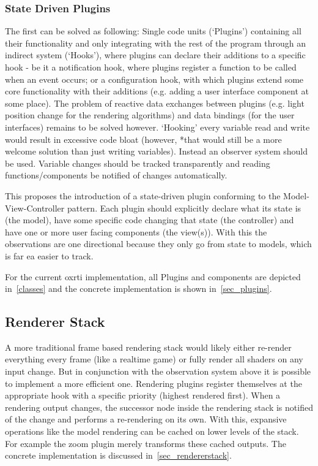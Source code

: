 \subsubsection{State Driven Plugins}
The first can be solved as following: Single code units (`Plugins')
containing all their functionality and only integrating with the rest of the
program through an indirect system (`Hooks'), where plugins can declare their
additions to a specific hook - be it a notification hook, where plugins register
a function to be called when an event occurs; or a configuration hook, with
which plugins extend some core functionality with their additions (e.g. adding a
user interface component at some place). The problem of reactive data
exchanges between plugins (e.g. light position change for the rendering
algorithms) and data bindings (for the user interfaces) remains to be solved however.
`Hooking' every variable read and write would result in excessive code bloat
(however, *that would still be a more welcome solution than just writing
variables). Instead an observer system should be used. Variable changes should
be tracked transparently and reading functions/components be notified of changes
automatically.

This proposes the introduction of a state-driven plugin conforming to the
Model-View-Controller pattern. Each plugin should explicitly declare what its
state is (the model), have some specific code changing that state (the
controller) and have one or more user facing components (the view(s)). With this
the observations are one directional because they only go
from state to models, which is far ea easier to track.

For the current oxrti implementation, all Plugins and components are depicted
in~\autoref{classes} and the concrete implementation is shown in~\autoref{sec_plugins}.


\subsection{Renderer Stack}
A more traditional frame based rendering stack would likely either re-render
everything every frame (like a realtime game) or fully render all shaders on any input change. But in conjunction with the observation system
above it is possible to implement a more efficient one. Rendering plugins
register themselves at the appropriate hook with a specific priority (highest
rendered first). When a rendering output changes, the successor node inside the
rendering stack is notified of the change and performs a re-rendering on its own.
With this, expansive operations like the model rendering can be cached on lower
levels of the stack. For example the zoom plugin merely transforms these cached outputs.
The concrete implementation is discussed in~\autoref{sec_rendererstack}.